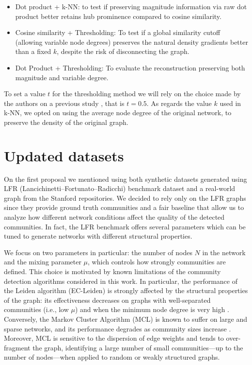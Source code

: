\documentclass[a4paper,11pt]{article}
\begin{document}
\begin{itemize}
    \item Dot product + k-NN: to test if preserving magnitude information via raw dot product better retains hub prominence compared to cosine similarity.
    \item Cosine similarity + Thresholding: To test if a global similarity cutoff (allowing variable node degrees) preserves the natural density gradients better than a fixed $k$, despite the risk of disconnecting the graph.
    \item Dot Product + Thresholding: To evaluate the reconstruction preserving both magnitude and variable degree.
\end{itemize}  
To set a value $t$ for the thresholding method we will rely on the choice made by the authors on a previous study \cite{yip2023restore}, that is $t=0.5$. As regards the value $k$ used in k-NN, we opted on using the average node degree of the original network, to preserve the density of the original graph.

\section{Updated datasets}
On the first proposal we mentioned using both synthetic datasets generated using LFR (Lancichinetti–Fortunato–Radicchi) \cite{lancichinetti2008benchmark} benchmark dataset and a real-world graph from the Stanford repositories. 
We decided to rely only on the LFR graphs since they provide ground truth communities and a fair baseline that allow us to analyze how different network conditions affect the quality of the detected communities. In fact, the LFR benchmark offers several parameters which can be tuned to generate networks with different structural properties. 

We focus on two parameters in particular: the number of nodes $N$ in the network and the mixing parameter $\mu$, which controls how strongly communities are defined. 
This choice is motivated by known limitations of the community detection algorithms considered in this work. In particular, the performance of the Leiden algorithm (EC-Leiden) is strongly affected by the structural properties of the graph: its effectiveness decreases on graphs with well-separated communities (i.e., low $\mu$) and when the minimum node degree is very high \cite{dollmann2023graph}. 
Conversely, the Markov Cluster Algorithm (MCL) is known to suffer on large and sparse networks, and its performance degrades as community sizes increase \cite{lancichinetti2009community}. Moreover, MCL is sensitive to the dispersion of edge weights and tends to over-fragment the graph, identifying a large number of small communities—up to the number of nodes—when applied to random or weakly structured graphs.
\end{document}
